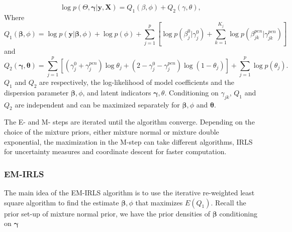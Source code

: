 \documentclass[AMA,STIX1COL,]{WileyNJD-v2}
\begin{document}
\[ \log p(\Theta, \boldsymbol{\gamma}| \textbf{y}, \textbf{X}) = Q_1(\beta, \phi) + Q_2 (\gamma,\theta),\]
Where
\[ Q_1(\boldsymbol{\beta}, \phi) = \log p(\textbf{y}|\boldsymbol{\beta}, \phi) + \log p(\phi) + \sum\limits_{j=1}^p\left[\log p(\beta^0_j|\gamma^0_j)+\sum\limits_{k=1}^{K_j} \log p(\beta^{pen}_{jk}|\gamma^{pen}_{jk})\right]\]
and \[
Q_2(\boldsymbol{\gamma},\boldsymbol{\theta}) = \sum\limits_{j=1}^{p} \left[ (\gamma^0_j+\gamma_{j}^{pen})\log \theta_j + (2-\gamma^0_j-\gamma_{j}^{pen}) \log (1-\theta_j)\right] +  \sum\limits_{j=1}^{p}\log p(\theta_j) .\]
\(Q_1\) and \(Q_2\) are respectively, the log-likelihood of model
coefficients and the dispersion parameter \(\boldsymbol{\beta}, \phi\),
and latent indicators \(\boldsymbol{\gamma}, \theta\). Conditioning on
\(\gamma_{jk}\), \(Q_1\) and \(Q_2\) are independent and can be
maximized separately for \(\boldsymbol{\beta}, \phi\) and
\(\boldsymbol{\theta}\).

The E- and M- steps are iterated until the algorithm converge. Depending
on the choice of the mixture priors, either mixture normal or mixture
double exponential, the maximization in the M-step can take different
algorithms, IRLS for uncertainty measures and coordinate descent for
faster computation.

\hfill\break

\hypertarget{em-irls}{%
\subsubsection{EM-IRLS}\label{em-irls}}

The main idea of the EM-IRLS algorithm is to use the iterative
re-weighted least square algorithm to find the estimate
\(\boldsymbol{\beta}, \phi\) that maximizes \(E(Q_1)\). Recall the prior
set-up of mixture normal prior, we have the prior densities of
\(\boldsymbol{\beta}\) conditioning on \(\boldsymbol{\gamma}\)
\end{document}
